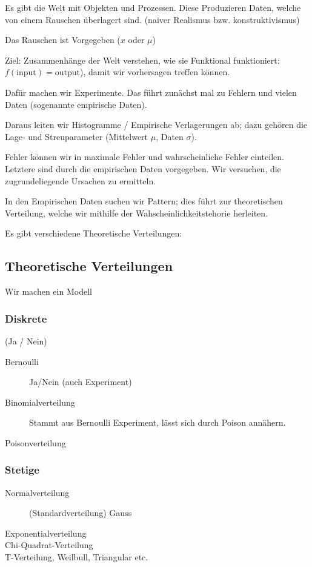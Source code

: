 Es gibt die Welt mit Objekten und Prozessen. Diese Produzieren Daten, welche von einem Rauschen überlagert sind. (naiver Realismus bzw. konstruktivismus)

Das Rauschen ist Vorgegeben ($x$ oder $\mu$)

Ziel: Zusammenhänge der Welt verstehen, wie sie Funktional funktioniert: $f(\text{input}) = \text{output}$), damit wir vorhersagen treffen können.

Dafür machen wir Experimente. Das führt zunächst mal zu Fehlern und vielen Daten (sogenannte empirische Daten).

Daraus leiten wir Histogramme / Empirische Verlagerungen ab; dazu gehören die Lage- und Streuparameter (Mittelwert $\mu$, Daten $\sigma$).

Fehler können wir in maximale Fehler und wahrscheinliche Fehler einteilen. Letztere sind durch die empirischen Daten vorgegeben. Wir versuchen, die zugrundeliegende Ursachen zu ermitteln.

In den Empirischen Daten suchen wir Pattern; dies führt zur theoretischen Verteilung, welche wir mithilfe der Wahscheinlichkeitstehorie herleiten.

Es gibt verschiedene Theoretische Verteilungen:


\subsection{Theoretische Verteilungen}
Wir machen ein Modell

\subsubsection{Diskrete}

(Ja / Nein)

\begin{description}
	\item[Bernoulli] Ja/Nein (auch Experiment)
	\item[Binomialverteilung] Stammt aus Bernoulli Experiment, lässt sich durch Poison annähern.
	\item[Poisonverteilung]
\end{description}

\subsubsection{Stetige}

\begin{description}
	\item[Normalverteilung] (Standardverteilung) Gauss
	\item[Exponentialverteilung]
	\item[Chi-Quadrat-Verteilung]
	\item[T-Verteilung, Weilbull, Triangular etc.]
\end{description}

